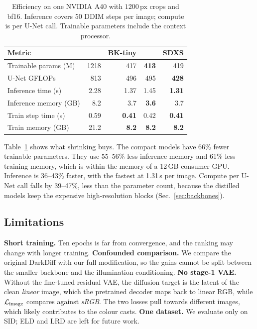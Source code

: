 \begin{table}[t]
  \centering
  \caption{Efficiency on one NVIDIA A40 with $1200$\,px crops and bf16. Inference covers
  50 DDIM steps per image; compute is per U-Net call. Trainable parameters include the context
  processor.}
  \label{tab:efficiency}
  \setlength{\tabcolsep}{3pt}
  \begin{tabular}{@{}lrrrr@{}}
    \toprule
    Metric & \sdtwo{} & BK-tiny & \tinysd{} & SDXS \\
    \midrule
    Trainable params (M)  & 1218 & 417  & \textbf{413}  & 419 \\
    U-Net GFLOPs          & 813  & 496  & 495  & \textbf{428} \\
    Inference time (s)    & 2.28 & 1.37 & 1.45 & \textbf{1.31} \\
    Inference memory (GB) & 8.2  & 3.7  & \textbf{3.6}  & 3.7 \\
    Train step time (s)   & 0.59 & \textbf{0.41} & 0.42 & \textbf{0.41} \\
    Train memory (GB)     & 21.2 & \textbf{8.2}  & \textbf{8.2}  & \textbf{8.2} \\
    \bottomrule
  \end{tabular}
\end{table}

Table~\ref{tab:efficiency} shows what shrinking buys. The compact models have 66\% fewer
trainable parameters. They use 55--56\% less inference memory and 61\% less training memory,
which is within the memory of a 12\,GB consumer GPU. Inference is 36--43\% faster,
with \sdxs{} the fastest at 1.31\,s per image. Compute per U-Net call falls by 39--47\%, less
than the parameter count, because the distilled models keep the expensive high-resolution
blocks (Sec.~\ref{sec:backbones}).

\subsection{Limitations}
\label{sec:limitations}

\textbf{Short training.} Ten epochs is far from convergence, and the ranking may change with
longer training.
\textbf{Confounded comparison.} We compare the original DarkDiff with our full modification, so
the gains cannot be split between the smaller backbone and the illumination conditioning.
\textbf{No stage-1 VAE.} Without the fine-tuned residual VAE, the diffusion target is the latent
of the clean \emph{linear} image, which the pretrained decoder maps back to linear RGB, while
$\mathcal{L}_{\mathrm{image}}$ compares against \emph{sRGB}. The two losses pull towards different images, which likely
contributes to the colour casts.
\textbf{One dataset.} We evaluate only on SID; ELD and LRD are left for future work.
